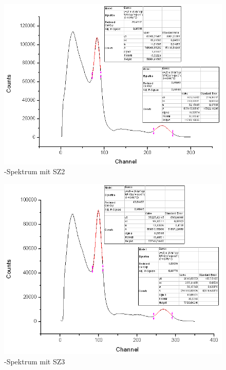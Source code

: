 \begin{figure}
 \includegraphics[height=0.3\textheight]{Graphen/SZ2.png}
 \caption{\Na-Spektrum mit SZ2}
\end{figure}

\begin{figure}
 \includegraphics[height=0.3\textheight]{Graphen/SZ3.png}
 \caption{\Na-Spektrum mit SZ3}
\end{figure}  

